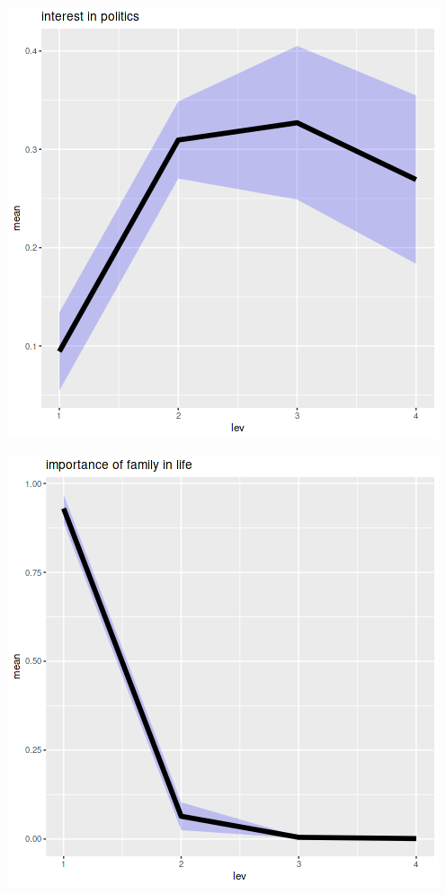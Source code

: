 \documentclass{amsart}
\begin{document}
\includegraphics[scale=0.6]{int_politics.png}

\includegraphics[scale=0.6]{life_imp_fam.png}
\end{document}
